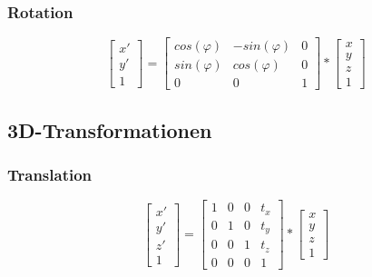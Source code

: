 \documentclass[10pt]{article}
\begin{document}
\subsubsection{Rotation}
\begin{equation}
\begin{bmatrix} x' \\ y' \\ 1\end{bmatrix}
= \begin{bmatrix}
cos(\varphi) & -sin(\varphi) & 0 \\
sin(\varphi) & cos(\varphi) & 0\\
0 & 0 & 1
\end{bmatrix} * \begin{bmatrix} x \\ y  \\ z\\ 1\end{bmatrix}
\end{equation}

\subsection{3D-Transformationen}
\subsubsection{Translation}
\begin{equation}
\begin{bmatrix} x' \\ y' \\ z'\\ 1\end{bmatrix}
= \begin{bmatrix}
1 & 0 & 0 & t_x \\
0 & 1 & 0 & t_y \\
0 & 0 & 1 & t_z \\
0 & 0 & 0 & 1
\end{bmatrix} * \begin{bmatrix} x \\ y  \\ z\\ 1\end{bmatrix}\end{equation}
\end{document}
